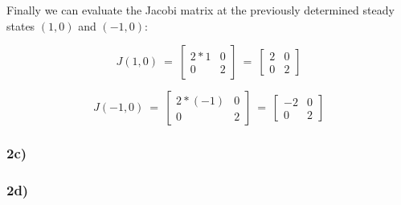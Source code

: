 \documentclass[]{scrartcl}
\begin{document}
Finally we can evaluate the Jacobi matrix at the previously determined steady states $(1,0)$ and $(-1,0)$:

\[
J(1,0) 
~=~
\begin{bmatrix}
  2*1 & 0 \\[1ex] %
  0 & 2
\end{bmatrix}
~=~
\begin{bmatrix}
  2 & 0 \\[1ex] %
  0 & 2
\end{bmatrix}
\]

\[
J(-1,0) 
~=~
\begin{bmatrix}
  2*(-1) & 0 \\[1ex] %
  0 & 2
\end{bmatrix}
~=~
\begin{bmatrix}
  -2 & 0 \\[1ex] %
  0 & 2
\end{bmatrix}
\]



\subsubsection*{2c)}





\subsubsection*{2d)}
\end{document}
